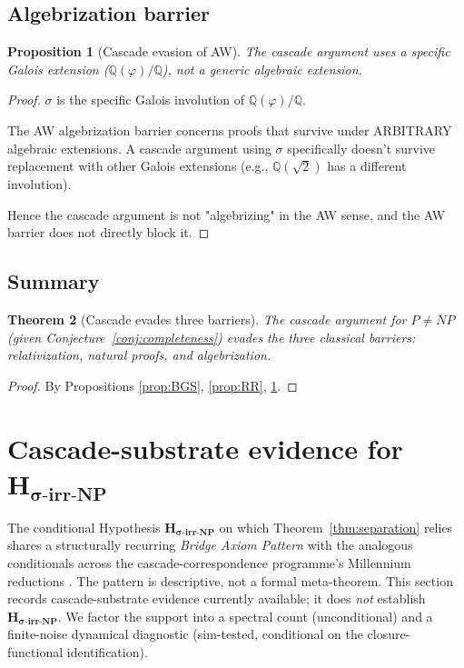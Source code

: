 \documentclass[11pt, a4paper]{amsart}
\newtheorem{theorem}{Theorem}[section]
\newtheorem{proposition}[theorem]{Proposition}
\theoremstyle{definition}
\newcommand{\pphi}{\varphi}
\begin{document}
\subsection{Algebrization barrier}

\begin{proposition}[Cascade evasion of AW]\label{prop:AW}
The cascade argument uses a specific Galois extension ($\mathbb{Q}(\pphi)
/ \mathbb{Q}$), not a generic algebraic extension.
\end{proposition}

\begin{proof}
$\sigma$ is the specific Galois involution of $\mathbb{Q}(\pphi)/\mathbb{Q}$.

The AW algebrization barrier concerns proofs that survive under
ARBITRARY algebraic extensions. A cascade argument using $\sigma$
specifically doesn't survive replacement with other Galois extensions
(e.g., $\mathbb{Q}(\sqrt 2)$ has a different involution).

Hence the cascade argument is not "algebrizing" in the AW sense, and
the AW barrier does not directly block it.
\end{proof}

\subsection{Summary}

\begin{theorem}[Cascade evades three barriers]\label{thm:evade}
The cascade argument for $P \neq NP$ (given Conjecture~\ref{conj:completeness})
evades the three classical barriers: relativization, natural proofs,
and algebrization.
\end{theorem}

\begin{proof}
By Propositions \ref{prop:BGS}, \ref{prop:RR}, \ref{prop:AW}.
\end{proof}

\section{Cascade-substrate evidence for $\mathbf{H_{\sigma\text{-irr-NP}}}$}\label{sec:attractor_support}

The conditional Hypothesis $\mathbf{H_{\sigma\text{-irr-NP}}}$ on
which Theorem~\ref{thm:separation} relies shares a structurally
recurring \emph{Bridge Axiom Pattern} with the analogous
conditionals across the cascade-correspondence programme's
Millennium reductions \cite{ConvergenceWithSmart, CascadeRHformal}.
The pattern is descriptive, not a formal meta-theorem.  This
section records cascade-substrate evidence currently available;
it does \emph{not} establish $\mathbf{H_{\sigma\text{-irr-NP}}}$.
We factor the support into a spectral count (unconditional) and a
finite-noise dynamical diagnostic (sim-tested, conditional on the
closure-functional identification).
\end{document}
